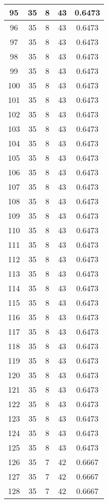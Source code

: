 \documentclass[letterpaper, 12pt]{article}
\begin{document}
\begin{longtable}{|c|c|c|c|c|}
95 & 35 & 8 & 43 & 0.6473 \\
\hline
96 & 35 & 8 & 43 & 0.6473 \\
\hline
97 & 35 & 8 & 43 & 0.6473 \\
\hline
98 & 35 & 8 & 43 & 0.6473 \\
\hline
99 & 35 & 8 & 43 & 0.6473 \\
\hline
100 & 35 & 8 & 43 & 0.6473 \\
\hline
101 & 35 & 8 & 43 & 0.6473 \\
\hline
102 & 35 & 8 & 43 & 0.6473 \\
\hline
103 & 35 & 8 & 43 & 0.6473 \\
\hline
104 & 35 & 8 & 43 & 0.6473 \\
\hline
105 & 35 & 8 & 43 & 0.6473 \\
\hline
106 & 35 & 8 & 43 & 0.6473 \\
\hline
107 & 35 & 8 & 43 & 0.6473 \\
\hline
108 & 35 & 8 & 43 & 0.6473 \\
\hline
109 & 35 & 8 & 43 & 0.6473 \\
\hline
110 & 35 & 8 & 43 & 0.6473 \\
\hline
111 & 35 & 8 & 43 & 0.6473 \\
\hline
112 & 35 & 8 & 43 & 0.6473 \\
\hline
113 & 35 & 8 & 43 & 0.6473 \\
\hline
114 & 35 & 8 & 43 & 0.6473 \\
\hline
115 & 35 & 8 & 43 & 0.6473 \\
\hline
116 & 35 & 8 & 43 & 0.6473 \\
\hline
117 & 35 & 8 & 43 & 0.6473 \\
\hline
118 & 35 & 8 & 43 & 0.6473 \\
\hline
119 & 35 & 8 & 43 & 0.6473 \\
\hline
120 & 35 & 8 & 43 & 0.6473 \\
\hline
121 & 35 & 8 & 43 & 0.6473 \\
\hline
122 & 35 & 8 & 43 & 0.6473 \\
\hline
123 & 35 & 8 & 43 & 0.6473 \\
\hline
124 & 35 & 8 & 43 & 0.6473 \\
\hline
125 & 35 & 8 & 43 & 0.6473 \\
\hline
126 & 35 & 7 & 42 & 0.6667 \\
\hline
127 & 35 & 7 & 42 & 0.6667 \\
\hline
128 & 35 & 7 & 42 & 0.6667 \\

\end{longtable}
\end{document}
